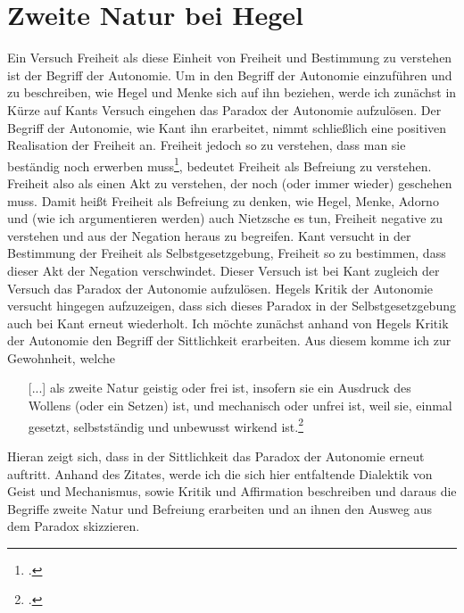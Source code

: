 \documentclass[12pt, a4paper, openany]{report}
\begin{document}
\section{Zweite Natur bei Hegel}\label{abschnitt_1}
Ein Versuch Freiheit als diese Einheit von Freiheit und Bestimmung zu verstehen ist der Begriff der Autonomie. 
Um in den Begriff der Autonomie einzuführen und zu beschreiben, wie Hegel und Menke sich auf ihn beziehen, werde ich zunächst in Kürze auf Kants Versuch eingehen das Paradox der Autonomie aufzulösen.
Der Begriff der Autonomie, wie Kant ihn erarbeitet, nimmt schließlich eine positiven Realisation der Freiheit an.
Freiheit jedoch so zu verstehen, dass man sie beständig noch erwerben muss\footcite[Vgl.][636]{nietzsche_morgenrote_1999}, bedeutet Freiheit als Befreiung zu verstehen. 
Freiheit also als einen Akt zu verstehen, der noch (oder immer wieder) geschehen muss.
Damit heißt Freiheit als Befreiung zu denken, wie Hegel, Menke, Adorno und (wie ich argumentieren werden) auch Nietzsche es tun, Freiheit negative zu verstehen und aus der Negation heraus zu begreifen.
Kant versucht in der Bestimmung der Freiheit als Selbstgesetzgebung, Freiheit so zu bestimmen, dass dieser Akt der Negation verschwindet. 
Dieser Versuch ist bei Kant zugleich der Versuch das Paradox der Autonomie aufzulösen. 
Hegels Kritik der Autonomie versucht hingegen aufzuzeigen, dass sich dieses Paradox in der Selbstgesetzgebung auch bei Kant erneut wiederholt.
Ich möchte zunächst anhand von Hegels Kritik der Autonomie den Begriff der Sittlichkeit erarbeiten.
Aus diesem komme ich zur Gewohnheit, welche
\begin{itemize}
    \item[] [...] als zweite Natur geistig oder frei ist, insofern sie ein Ausdruck des Wollens (oder ein Setzen) ist, und mechanisch oder unfrei ist, weil sie, einmal gesetzt, selbstständig und unbewusst wirkend ist.\footcite[][145]{menke_autonomie_2018}
\end{itemize}
Hieran zeigt sich, dass in der Sittlichkeit das Paradox der Autonomie erneut auftritt. 
Anhand des Zitates, werde ich die sich hier entfaltende Dialektik von Geist und Mechanismus, sowie Kritik und Affirmation beschreiben und daraus die Begriffe zweite Natur und Befreiung erarbeiten und an ihnen den Ausweg aus dem Paradox skizzieren.
\end{document}
